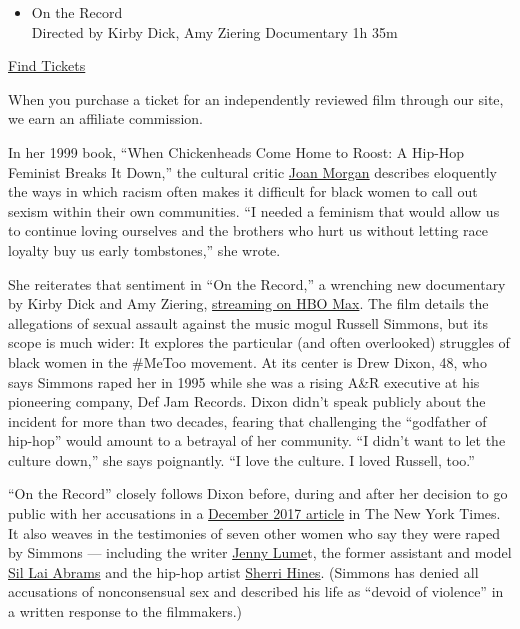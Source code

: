 \begin{itemize}
\tightlist
\item
  On the Record\\
  Directed by Kirby Dick, Amy Ziering Documentary 1h 35m
\end{itemize}

\href{https://www.imdb.com/showtimes/title/tt11394650?ref_=ref_ext_NYT}{Find
Tickets}

When you purchase a ticket for an independently reviewed film through
our site, we earn an affiliate commission.

In her 1999 book, ``When Chickenheads Come Home to Roost: A Hip-Hop
Feminist Breaks It Down,'' the cultural critic
\href{https://www.nytimes3xbfgragh.onion/2018/08/15/books/review-she-begat-this-lauryn-hill-joan-morgan.html}{Joan
Morgan} describes eloquently the ways in which racism often makes it
difficult for black women to call out sexism within their own
communities. ``I needed a feminism that would allow us to continue
loving ourselves and the brothers who hurt us without letting race
loyalty buy us early tombstones,'' she wrote.

She reiterates that sentiment in ``On the Record,'' a wrenching new
documentary by Kirby Dick and Amy Ziering,
\href{https://www.hbomax.com/feature/urn:hbo:feature:GXrw_sA07SZGXWQEAAADb}{streaming
on HBO Max}. The film details the allegations of sexual assault against
the music mogul Russell Simmons, but its scope is much wider: It
explores the particular (and often overlooked) struggles of black women
in the \#MeToo movement. At its center is Drew Dixon, 48, who says
Simmons raped her in 1995 while she was a rising A\&R executive at his
pioneering company, Def Jam Records. Dixon didn't speak publicly about
the incident for more than two decades, fearing that challenging the
``godfather of hip-hop'' would amount to a betrayal of her community.
``I didn't want to let the culture down,'' she says poignantly. ``I love
the culture. I loved Russell, too.''

``On the Record'' closely follows Dixon before, during and after her
decision to go public with her accusations in a
\href{https://www.nytimes3xbfgragh.onion/2017/12/13/arts/music/russell-simmons-rape.html}{December
2017 article} in The New York Times. It also weaves in the testimonies
of seven other women who say they were raped by Simmons --- including
the writer
\href{https://www.hollywoodreporter.com/news/writer-jenny-lumet-russell-simmons-sexually-violated-me-guest-column-1062934}{Jenny
Lume}t, the former assistant and model
\href{https://www.usatoday.com/story/entertainment/tv/2019/10/21/nbc-russell-simmons-aj-calloway-accuser-sil-lai-abrams/4051745002/}{Sil
Lai Abrams} and the hip-hop artist
\href{https://www.wnyc.org/story/woman-speaks-out-against-russell-simmons-alleged-rape/}{Sherri
Hines}. (Simmons has denied all accusations of nonconsensual sex and
described his life as ``devoid of violence'' in a written response to
the filmmakers.)

